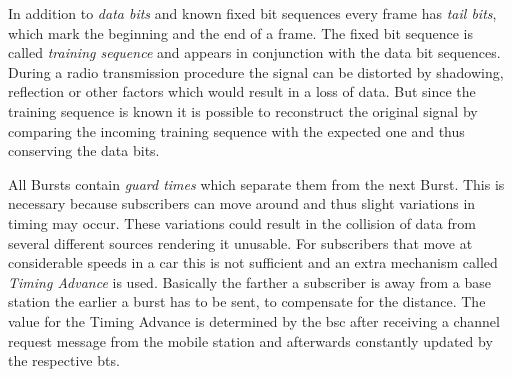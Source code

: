 In addition to \emph{data bits} and known fixed bit sequences every frame has \emph{tail bits}, which mark the beginning and the end of a frame.
The fixed bit sequence is called \emph{training sequence} and appears in conjunction with the data bit sequences.
During a radio transmission procedure the signal can be distorted by shadowing, reflection or other factors which would result in a loss of data.
But since the training sequence is known it is possible to reconstruct the original signal by comparing the incoming training sequence with the expected one and thus conserving the data bits.

All Bursts contain \emph{guard times} which separate them from the next Burst.
This is necessary because subscribers can move around and thus slight variations in timing may occur.
These variations could result in the collision of data from several different sources rendering it unusable.
For subscribers that move at considerable speeds \eg in a car this is not sufficient and an extra mechanism called \emph{Timing Advance} is used.
Basically the farther a subscriber is away from a base station the earlier a burst has to be sent, to compensate for the distance.
The value for the Timing Advance is determined by the \gls{bsc} after receiving a channel request message from the mobile station and afterwards constantly updated by the respective \gls{bts}.

